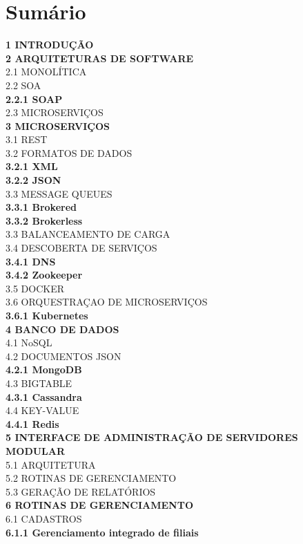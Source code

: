 \section{Sumário}

  \noindent
  \textbf{1 INTRODUÇÃO} \\
  \textbf{2 ARQUITETURAS DE SOFTWARE} \\
  2.1 MONOLÍTICA \\
  2.2 SOA \\
  \textbf{2.2.1 SOAP} \\
  2.3 MICROSERVIÇOS \\
  \textbf{3 MICROSERVIÇOS} \\
  3.1 REST \\
  3.2 FORMATOS DE DADOS \\
  \textbf{3.2.1 XML} \\
  \textbf{3.2.2 JSON} \\
  3.3 MESSAGE QUEUES \\
  \textbf{3.3.1 Brokered} \\
  \textbf{3.3.2 Brokerless} \\
  3.3 BALANCEAMENTO DE CARGA \\
  3.4 DESCOBERTA DE SERVIÇOS \\
  \textbf{3.4.1 DNS} \\
  \textbf{3.4.2 Zookeeper} \\
  3.5 DOCKER \\
  3.6 ORQUESTRAÇAO DE MICROSERVIÇOS \\
  \textbf{3.6.1 Kubernetes} \\
  \textbf{4 BANCO DE DADOS} \\
  4.1 NoSQL \\
  4.2 DOCUMENTOS JSON \\
  \textbf{4.2.1 MongoDB} \\
  4.3 BIGTABLE \\
  \textbf{4.3.1 Cassandra} \\
  4.4 KEY-VALUE \\
  \textbf{4.4.1 Redis} \\
  \textbf{5 INTERFACE DE ADMINISTRAÇÃO DE SERVIDORES MODULAR} \\
  5.1 ARQUITETURA \\
  5.2 ROTINAS DE GERENCIAMENTO \\
  5.3 GERAÇÃO DE RELATÓRIOS \\
  \textbf{6 ROTINAS DE GERENCIAMENTO} \\
  6.1 CADASTROS \\
  \textbf{6.1.1 Gerenciamento integrado de filiais} \\

